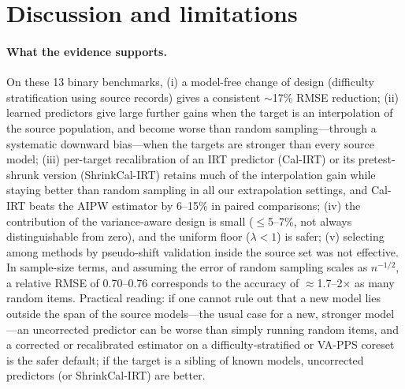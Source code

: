 \section{Discussion and limitations}
\label{sec:discussion}
\paragraph{What the evidence supports.}
On these 13 binary benchmarks, (i) a model-free change of design (difficulty stratification using source records) gives a consistent $\sim$17\% RMSE reduction; (ii) learned predictors give large further gains when the target is an interpolation of the source population, and become worse than random sampling---through a systematic downward bias---when the targets are stronger than every source model; (iii) per-target recalibration of an IRT predictor (Cal-IRT) or its pretest-shrunk version (ShrinkCal-IRT) retains much of the interpolation gain while staying better than random sampling in all our extrapolation settings, and Cal-IRT beats the AIPW estimator by 6--15\% in paired comparisons; (iv) the contribution of the variance-aware design is small ($\le$5--7\%, not always distinguishable from zero), and the uniform floor ($\lambda<1$) is safer; (v) selecting among methods by pseudo-shift validation inside the source set was not effective. In sample-size terms, and assuming the error of random sampling scales as $n^{-1/2}$, a relative RMSE of 0.70--0.76 corresponds to the accuracy of $\approx$1.7--2$\times$ as many random items. Practical reading: if one cannot rule out that a new model lies outside the span of the source models---the usual case for a new, stronger model---an uncorrected predictor can be worse than simply running random items, and a corrected or recalibrated estimator on a difficulty-stratified or VA-PPS coreset is the safer default; if the target is a sibling of known models, uncorrected predictors (or ShrinkCal-IRT) are better.

